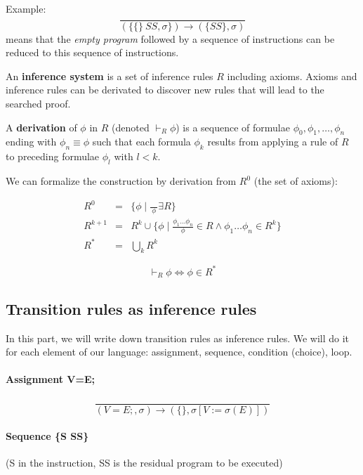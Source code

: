 \documentclass[12pt, a4paper]{book}
\begin{document}
Example:
$$
\frac{}
{(\{ \{ \} \ SS, \sigma \}) \longrightarrow (\{ SS \}, \sigma)}
$$
means that the \textit{empty program} followed by a sequence of instructions can
be reduced to this sequence of instructions. \newline

An \textbf{inference system} is a set of inference rules $R$ including axioms.
Axioms and inference rules can be derivated to discover new rules that will lead
to the searched proof. \newline

A \textbf{derivation} of $\phi$ in $R$ (denoted $\vdash_R \phi$) is a sequence
of formulae $\phi_0,\phi_1,\ldots,\phi_n$ ending with $\phi_n \equiv \phi$ such
that each formula $\phi_k$ results from applying a rule of $R$ to preceding
formulae $\phi_l$ with $l<k$. \newline

We can formalize the construction by derivation from $R^0$ (the set of axioms):

\begin{eqnarray}
R^{0}   & = & \{\phi \mid \frac{}{\ \phi \ } \exists R\} \\
R^{k+1} & = & R^{k} \cup \{ \phi \mid \frac{\phi_{1} \ldots \phi_{n}}{\phi}
\in R \land \phi_{1}\ldots\phi_{n} \in R^{k} \} \\
R^{*}   & = & \bigcup_{k} R^{k}
\end{eqnarray}

$$
\vdash_{R} \phi \iff \phi \in R^{*}
$$

\subsection{Transition rules as inference rules}
\label{sub:Transition rules as inference rules}

In this part, we will write down transition rules as inference rules. We will
do it for each element of our language: assignment, sequence, condition
(choice), loop.

\paragraph{Assignment V=E;}

$$
\frac{}
{(V=E;,\sigma) \longrightarrow (\{ \}, \sigma [V := \sigma (E)] )}
$$

\paragraph{Sequence \{S SS\}} (S in the instruction, SS is the residual program
to be executed)
\end{document}
